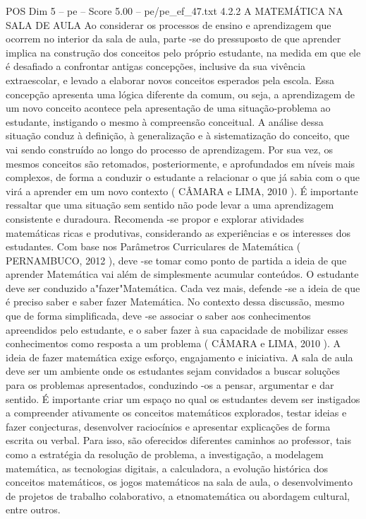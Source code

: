 \begin{textsample}{POS Dim 5 – pe – Score 5.00 – pe/pe\_ef\_47.txt}  \label{ex:f5_pos_207}
4.2.2 A MATEMÁTICA NA SALA DE AULA Ao considerar os processos de ensino e aprendizagem que ocorrem no interior da sala de aula, parte -se do pressuposto de que aprender implica na construção dos conceitos pelo próprio estudante, na medida em que ele é desafiado a confrontar antigas concepções, inclusive da sua vivência extraescolar, e levado a elaborar novos conceitos esperados pela escola.
Essa concepção apresenta uma lógica diferente da comum, ou seja, a aprendizagem de um novo conceito acontece pela apresentação de uma situação-problema ao estudante, instigando o mesmo à compreensão conceitual.
A análise dessa situação conduz à definição, à generalização e à sistematização do conceito, que vai sendo construído ao longo do processo de aprendizagem.
Por sua vez, os mesmos conceitos são retomados, posteriormente, e aprofundados em níveis mais complexos, de forma a conduzir o estudante a relacionar o que já sabia com o que virá a aprender em um novo contexto ( CÂMARA e LIMA, 2010 ).
É importante ressaltar que uma situação sem sentido não pode levar a uma aprendizagem consistente e duradoura.
Recomenda -se propor e explorar atividades matemáticas ricas e produtivas, considerando as experiências e os interesses dos estudantes.
Com base nos Parâmetros Curriculares de Matemática ( PERNAMBUCO, 2012 ), deve -se tomar como ponto de partida a ideia de que aprender Matemática vai além de simplesmente acumular conteúdos.
O estudante deve ser conduzido a"fazer"Matemática.
Cada vez mais, defende -se a ideia de que é preciso saber e saber fazer Matemática.
No contexto dessa discussão, mesmo que de forma simplificada, deve -se associar o saber aos conhecimentos apreendidos pelo estudante, e o saber fazer à sua capacidade de mobilizar esses conhecimentos como resposta a um problema ( CÂMARA e LIMA, 2010 ).
A ideia de fazer matemática exige esforço, engajamento e iniciativa.
A sala de aula deve ser um ambiente onde os estudantes sejam convidados a buscar soluções para os problemas apresentados, conduzindo -os a pensar, argumentar e dar sentido.
É importante criar um espaço no qual os estudantes devem ser instigados a compreender ativamente os conceitos matemáticos explorados, testar ideias e fazer conjecturas, desenvolver raciocínios e apresentar explicações de forma escrita ou verbal.
Para isso, são oferecidos diferentes caminhos ao professor, tais como a estratégia da resolução de problema, a investigação, a modelagem matemática, as tecnologias digitais, a calculadora, a evolução histórica dos conceitos matemáticos, os jogos matemáticos na sala de aula, o desenvolvimento de projetos de trabalho colaborativo, a etnomatemática ou abordagem cultural, entre outros.

\end{textsample}
